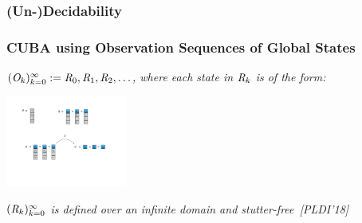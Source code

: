 \documentclass[aspectratio=169]{beamer}
\newcommand{\bhand}{\color{blue}{\ding{43}}}
\begin{document}
\begin{frame}
  \frametitle{(Un-)Decidability}
\end{frame}

\begin{frame}
  \frametitle{CUBA using Observation Sequences of Global States}
  \begin{block}{}
    {\bhand} \emph{$\OS := \reached[0], \reached[1],\reached[2], \ldots$, where each state in $\reached[k]$ is of the form:}
    \begin{center}
      \includegraphics[width=0.3\textwidth]{figures/brain/cpds-state}
    \end{center}
    \vskip10pt
      \begin{center}
        \emph{$\OSone$ is defined over an \alert{infinite} domain and \alert{stutter-free}~[PLDI'18]}
      \end{center}
    \end{block}
\end{frame}
\end{document}
